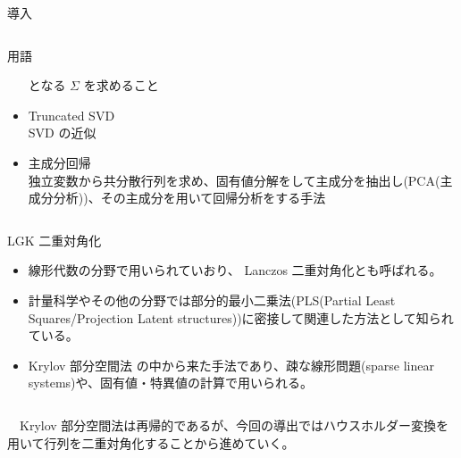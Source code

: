 \documentclass[dvipdfmx,10pt,presentation]{beamer}
\begin{document}
\begin{frame}[allowframebreaks]{導入}
\begin{columns}
\begin{column}{1.00\columnwidth}
\begin{block}{用語}
\begin{itemize}
となる \(\Sigma\) を求めること\\
\item Truncated SVD\\
SVD の近似\\
\item 主成分回帰\\
独立変数から共分散行列を求め、固有値分解をして主成分を抽出し(PCA(主成分分析))、その主成分を用いて回帰分析をする手法\\
\end{itemize}
\end{block}
\end{column}
\end{columns}
\end{frame}

\begin{frame}[label={sec:orgf061d7b}]{}
\begin{columns}
\begin{column}{1.00\columnwidth}
\begin{block}{LGK 二重対角化}
\begin{itemize}
\item 線形代数の分野で用いられていおり、 Lanczos 二重対角化とも呼ばれる。\\
\item 計量科学やその他の分野では部分的最小二乗法(PLS(Partial Least Squares/Projection Latent structures))に密接して関連した方法として知られている。\\
\item Krylov 部分空間法 の中から来た手法であり、疎な線形問題(sparse linear systems)や、固有値・特異値の計算で用いられる。\\
\end{itemize}
\end{block}
\end{column}
\end{columns}
\end{frame}
\begin{frame}[label={sec:org87155f3}]{}
　Krylov 部分空間法は再帰的であるが、今回の導出ではハウスホルダー変換を用いて行列を二重対角化することから進めていく。\\
\end{frame}
\end{document}
